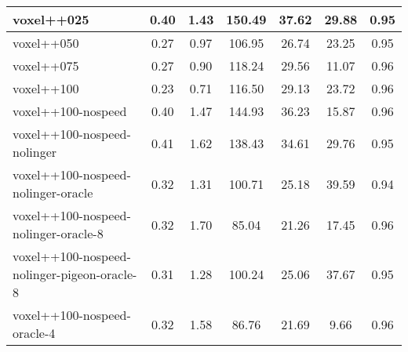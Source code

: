 \begin{sidewaystable}
\begin{longtable}{|l|c|c|c|c|c|c|}
voxel++025 & {\cellcolor[HTML]{71B7A9}} \color[HTML]{F1F1F1} 0.40 & {\cellcolor[HTML]{86C2B5}} \color[HTML]{000000} 1.43 & {\cellcolor[HTML]{56AA99}} \color[HTML]{F1F1F1} 150.49 & 37.62 & 29.88 & 0.95 \\ \hline
voxel++050 & {\cellcolor[HTML]{98CAC0}} \color[HTML]{000000} 0.27 & {\cellcolor[HTML]{A7D2C9}} \color[HTML]{000000} 0.97 & {\cellcolor[HTML]{8EC5BA}} \color[HTML]{000000} 106.95 & 26.74 & 23.25 & 0.95 \\ \hline
voxel++075 & {\cellcolor[HTML]{99CBC0}} \color[HTML]{000000} 0.27 & {\cellcolor[HTML]{ADD4CC}} \color[HTML]{000000} 0.90 & {\cellcolor[HTML]{7FBEB1}} \color[HTML]{000000} 118.24 & 29.56 & 11.07 & 0.96 \\ \hline
voxel++100 & {\cellcolor[HTML]{A6D1C8}} \color[HTML]{000000} 0.23 & {\cellcolor[HTML]{BADBD4}} \color[HTML]{000000} 0.71 & {\cellcolor[HTML]{81BFB3}} \color[HTML]{000000} 116.50 & 29.13 & 23.72 & 0.96 \\ \hline
voxel++100-nospeed & {\cellcolor[HTML]{70B7A9}} \color[HTML]{F1F1F1} 0.40 & {\cellcolor[HTML]{82C0B3}} \color[HTML]{000000} 1.47 & {\cellcolor[HTML]{5DAE9D}} \color[HTML]{F1F1F1} 144.93 & 36.23 & 15.87 & 0.96 \\ \hline
voxel++100-nospeed-nolinger & {\cellcolor[HTML]{6CB5A6}} \color[HTML]{F1F1F1} 0.41 & {\cellcolor[HTML]{78BBAD}} \color[HTML]{000000} 1.62 & {\cellcolor[HTML]{65B2A2}} \color[HTML]{F1F1F1} 138.43 & 34.61 & 29.76 & 0.95 \\ \hline
voxel++100-nospeed-nolinger-oracle & {\cellcolor[HTML]{8BC4B8}} \color[HTML]{000000} 0.32 & {\cellcolor[HTML]{8EC5BA}} \color[HTML]{000000} 1.31 & {\cellcolor[HTML]{95C9BE}} \color[HTML]{000000} 100.71 & 25.18 & 39.59 & 0.94 \\ \hline
voxel++100-nospeed-nolinger-oracle-8 & {\cellcolor[HTML]{88C3B7}} \color[HTML]{000000} 0.32 & {\cellcolor[HTML]{72B8AA}} \color[HTML]{F1F1F1} 1.70 & {\cellcolor[HTML]{A9D2CA}} \color[HTML]{000000} 85.04 & 21.26 & 17.45 & 0.96 \\ \hline
voxel++100-nospeed-nolinger-pigeon-oracle-8 & {\cellcolor[HTML]{8CC5B9}} \color[HTML]{000000} 0.31 & {\cellcolor[HTML]{90C7BC}} \color[HTML]{000000} 1.28 & {\cellcolor[HTML]{96C9BF}} \color[HTML]{000000} 100.24 & 25.06 & 37.67 & 0.95 \\ \hline
voxel++100-nospeed-oracle-4 & {\cellcolor[HTML]{8BC4B8}} \color[HTML]{000000} 0.32 & {\cellcolor[HTML]{7BBCAF}} \color[HTML]{000000} 1.58 & {\cellcolor[HTML]{A7D2C9}} \color[HTML]{000000} 86.76 & 21.69 & 9.66 & 0.96 \\ \hline

\end{longtable}
\end{sidewaystable}
